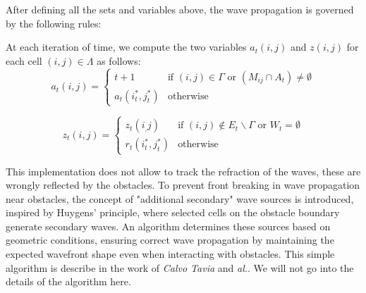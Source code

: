 \documentclass[../main.tex]{subfiles}
\begin{document}
\vspace{1em}
After defining all the sets and variables above, the wave propagation is governed by the following rules:

\vspace{1em}

At each iteration of time, we compute the two variables $a_t (i, j)$ and $z(i, j)$ for each cell $(i, j) \in \Lambda$ as follows:
$$a_t (i, j) = 
\begin{cases}
	t +1 & \text{if }  (i, j) \in \Gamma \text{ or } (M_{ij} \cap  A_t) \neq \emptyset\\
	a_t(i_t^{*}, j_t^{*}) & \text{otherwise}
\end{cases}
$$


$$z_t (i, j) = 
\begin{cases}
	z_t(i_, j) & \text{if } (i, j) \notin E_t \backslash \Gamma \text{ or } W_t = \emptyset\\
	r_t(i_t^{*}, j_t^{*}) & \text{otherwise}
\end{cases}
$$

This implementation does not allow to track the refraction of the waves, these are wrongly reflected by the obstacles. To prevent front breaking in wave propagation near obstacles, the concept of "additional secondary" wave sources is introduced, inspired by Huygens' principle, where selected cells on the obstacle boundary generate secondary waves. An algorithm determines these sources based on geometric conditions, ensuring correct wave propagation by maintaining the expected wavefront shape even when interacting with obstacles. This simple algorithm is describe in the work of \textit{Calvo Tavia} and \textit{al.}\cite{tapia_2016}. We will not go into the details of the algorithm here.
\end{document}

